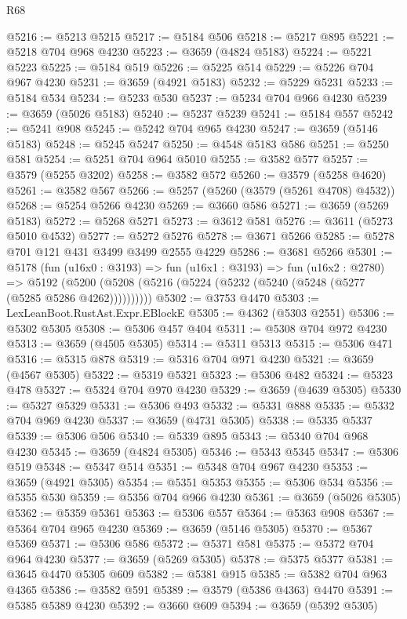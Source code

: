 \begin{lexlean}{R68}
\begin{coremodule}
@5216 := @5213 @5215
@5217 := @5184 @506
@5218 := @5217 @895
@5221 := @5218 @704 @968 @4230
@5223 := @3659 (@4824 @5183)
@5224 := @5221 @5223
@5225 := @5184 @519
@5226 := @5225 @514
@5229 := @5226 @704 @967 @4230
@5231 := @3659 (@4921 @5183)
@5232 := @5229 @5231
@5233 := @5184 @534
@5234 := @5233 @530
@5237 := @5234 @704 @966 @4230
@5239 := @3659 (@5026 @5183)
@5240 := @5237 @5239
@5241 := @5184 @557
@5242 := @5241 @908
@5245 := @5242 @704 @965 @4230
@5247 := @3659 (@5146 @5183)
@5248 := @5245 @5247
@5250 := @4548 @5183 @586
@5251 := @5250 @581
@5254 := @5251 @704 @964 @5010
@5255 := @3582 @577
@5257 := @3579 (@5255 @3202)
@5258 := @3582 @572
@5260 := @3579 (@5258 @4620)
@5261 := @3582 @567
@5266 := @5257 (@5260 (@3579 (@5261 @4708) @4532))
@5268 := @5254 @5266 @4230
@5269 := @3660 @586
@5271 := @3659 (@5269 @5183)
@5272 := @5268 @5271
@5273 := @3612 @581
@5276 := @3611 (@5273 @5010 @4532)
@5277 := @5272 @5276
@5278 := @3671 @5266
@5285 := @5278 @701 @121 @431 @3499 @3499 @2555 @4229
@5286 := @3681 @5266
@5301 := @5178
    (fun (u16x0 : @3193) =>
    fun (u16x1 : @3193) =>
    fun (u16x2 : @2780) =>
    @5192 (@5200 (@5208 (@5216 (@5224 (@5232 (@5240 (@5248 (@5277 (@5285 @5286 @4262))))))))))
@5302 := @3753 @4470
@5303 := LexLeanBoot.RustAst.Expr.EBlockE
@5305 := @4362 (@5303 @2551)
@5306 := @5302 @5305
@5308 := @5306 @457 @404
@5311 := @5308 @704 @972 @4230
@5313 := @3659 (@4505 @5305)
@5314 := @5311 @5313
@5315 := @5306 @471
@5316 := @5315 @878
@5319 := @5316 @704 @971 @4230
@5321 := @3659 (@4567 @5305)
@5322 := @5319 @5321
@5323 := @5306 @482
@5324 := @5323 @478
@5327 := @5324 @704 @970 @4230
@5329 := @3659 (@4639 @5305)
@5330 := @5327 @5329
@5331 := @5306 @493
@5332 := @5331 @888
@5335 := @5332 @704 @969 @4230
@5337 := @3659 (@4731 @5305)
@5338 := @5335 @5337
@5339 := @5306 @506
@5340 := @5339 @895
@5343 := @5340 @704 @968 @4230
@5345 := @3659 (@4824 @5305)
@5346 := @5343 @5345
@5347 := @5306 @519
@5348 := @5347 @514
@5351 := @5348 @704 @967 @4230
@5353 := @3659 (@4921 @5305)
@5354 := @5351 @5353
@5355 := @5306 @534
@5356 := @5355 @530
@5359 := @5356 @704 @966 @4230
@5361 := @3659 (@5026 @5305)
@5362 := @5359 @5361
@5363 := @5306 @557
@5364 := @5363 @908
@5367 := @5364 @704 @965 @4230
@5369 := @3659 (@5146 @5305)
@5370 := @5367 @5369
@5371 := @5306 @586
@5372 := @5371 @581
@5375 := @5372 @704 @964 @4230
@5377 := @3659 (@5269 @5305)
@5378 := @5375 @5377
@5381 := @3645 @4470 @5305 @609
@5382 := @5381 @915
@5385 := @5382 @704 @963 @4365
@5386 := @3582 @591
@5389 := @3579 (@5386 @4363) @4470
@5391 := @5385 @5389 @4230
@5392 := @3660 @609
@5394 := @3659 (@5392 @5305)

\end{coremodule}
\end{lexlean}
